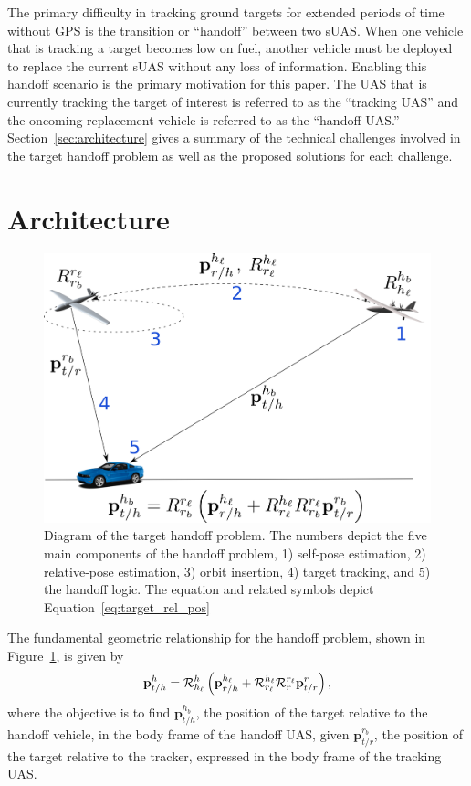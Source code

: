 The primary difficulty in tracking ground targets for extended periods of time without GPS is the transition or ``handoff'' between two sUAS.
When one vehicle that is tracking a target becomes low on fuel, another vehicle must be deployed to replace the current sUAS without any loss of information.
Enabling this handoff scenario is the primary motivation for this paper.
The UAS that is currently tracking the target of interest is referred to as the ``tracking UAS'' and the oncoming replacement vehicle is referred to as the ``handoff UAS.'' Section~\ref{sec:architecture} gives a summary of the technical challenges involved in the target handoff problem as well as the proposed solutions for each challenge.


\section{Architecture}
\begin{figure}[hbt]
    \centering
    \includegraphics[width=1.0\columnwidth]{figures/intro/handoff_diagram_with_eq1}
    \caption{Diagram of the target handoff problem. The numbers depict the five main components of the handoff problem, 1) self-pose estimation, 2) relative-pose estimation, 3) orbit insertion, 4) target tracking, and 5) the handoff logic. The equation and related symbols depict Equation~\eqref{eq:target_rel_pos}}
    \label{fig:handoff_diagram}
\end{figure}

The fundamental geometric relationship for the handoff problem, shown in Figure~\ref{fig:handoff_diagram}, is given by
        \begin{equation} \label{eq:target_rel_pos}
            {\mathbf{p}}_{t/h}^{h} = {\mathcal{R}}_{{h_\ell}}^{{h}}\left({\mathbf{p}}_{r/h}^{h_\ell} + {\mathcal{R}}_{{r_\ell}}^{{h_\ell}}{\mathcal{R}}_{{r}}^{{r_\ell}}{\mathbf{p}}_{t/r}^{r}\right),
        \end{equation}
where the objective is to find $\mathbf{p}_{t/h}^{h_b}$, the position of the target relative to the handoff vehicle, in the body frame of the handoff UAS, given $\mathbf{p}_{t/r}^{r_b}$, the position of the target relative to the tracker, expressed in the body frame of the tracking UAS.


